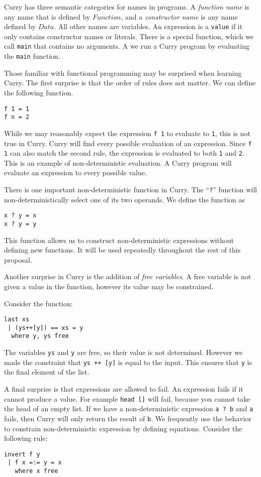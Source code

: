 Curry has three semantic categories for names in programs.
A \textit{function name} is any name that is defined by $Function$, and a \textit{constructor name}
is any name defined by $Data$.  All other names are variables.
An expression is a \texttt{value} if it only contains constructor names or literals.
There is a special function, which we call \texttt{main} that contains no arguments.
A we run a Curry program by evaluating the \texttt{main} function.

Those familiar with functional programming may be surprised when learning Curry.
The first surprise is that the order of rules does not matter.
We can define the following function.
\begin{verbatim}
f 1 = 1
f n = 2
\end{verbatim}

While we may reasonably expect the expression \texttt{f 1} to evaluate to \texttt 1, this is not true in Curry.
Curry will find every possible evaluation of an expression.
Since \texttt{f 1} can also match the second rule, the expression is evaluated to both \texttt 1 and \texttt 2.
This is an example of non-deterministic evaluation.
A Curry program will evaluate an expression to every possible value.

There is one important non-deterministic function in Curry.
The ``\texttt{?}'' function will non-deterministically select one of its two operands.
We define the function as

\begin{verbatim}
x ? y = x
x ? y = y
\end{verbatim}

This function allows us to construct non-deterministic expressions without defining new functions.
It will be used repeatedly throughout the rest of this proposal.

Another surprise in Curry is the addition of \textit{free variables}.
A free variable is not given a value in the function, however its value may be constrained.

Consider the function:
\begin{verbatim}
last xs
 | (ys++[y]) == xs = y
  where y, ys free
\end{verbatim}

The variables \texttt{ys} and \texttt y are free, so their value is not determined.
However we made the constraint that \texttt{ys ++ [y]} is equal to the input.
This ensures that \texttt y is the final element of the list.

A final surprise is that expressions are allowed to fail.
An expression fails if it cannot produce a value.
For example \texttt{head []} will fail, because you cannot take the head of an empty list.
If we have a non-deterministic expression \texttt{a ? b} and \texttt a fails, then Curry will only return the result of \texttt b.
We frequently use the behavior to constrain non-deterministic expression by defining equations.
Consider the following rule:
\begin{verbatim}
invert f y
 | f x =:= y = x
   where x free
\end{verbatim}

